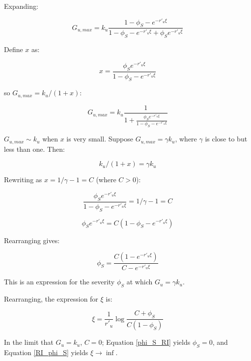 \documentclass{article}
\begin{document}
Expanding:

\begin{equation}
  G_{u,max} =  k_u  \frac{1- \phi_S - e^{-r'_u \xi} }{1  - \phi_S - e^{-r'_u \xi} + \phi_S  e^{-r'_u \xi}}
\end{equation}

Define $x$ as:

\begin{equation}
x = \frac{ \phi_S  e^{-r'_u \xi}}{1- \phi_S - e^{-r'_u \xi}}
\end{equation}

so $ G_{u,max} = k_u /(1+x)$:

\begin{equation}
G_{u,max}  = k_u \frac{1}{1 + \frac{ \phi_S  e^{-r'_u \xi}}{1- \phi_S - e^{-r'_u \xi}}}
\end{equation}


$G_{u,max} \sim k_u$ when $x$ is very small.
Suppose $G_{u,max} = \gamma k_u$, where $\gamma$ is close to but less than one.  Then:


\begin{equation}
 k_u /(1+x) = \gamma k_u
\end{equation}

Rewriting as  $x = 1/\gamma  - 1= C$ (where $C> 0$):

\begin{equation}
 \frac{ \phi_S  e^{-r'_u \xi}}{1- \phi_S - e^{-r'_u \xi}} =  1/\gamma  - 1 = C
\end{equation}

\begin{equation}
{ \phi_S  e^{-r'_u \xi}} = C ({1- \phi_S - e^{-r'_u \xi}} )
\end{equation}

Rearranging gives:

\begin{equation}
 \phi_S   =  \frac{C(1 - e^{-r'_u \xi})}{C  - e^{-r'_u \xi}}
 \label{phi_S_RI}
 \end{equation}

This is an expression for the severity $ \phi_S $ at which $G_u = \gamma k_u$.

Rearranging, the expression for $\xi$ is:


\begin{equation}
\xi   =  \frac{1}{r'_u}\log \frac{C  +\phi_S } {C(1 - \phi_S)}
 \label{RI_phi_S}
 \end{equation}

In the limit that  $G_u = k_u$, $C=0$;
 Equation \ref{phi_S_RI} yields $\phi_S = 0$,  and Equation \ref{RI_phi_S} yields $\xi \rightarrow \inf$.
\end{document}
